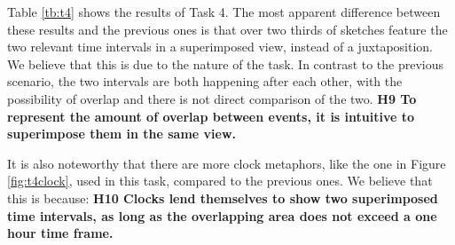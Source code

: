 Table \ref{tb:t4} shows the results of Task 4. The most apparent difference between these results and the previous ones is that over two thirds of sketches feature the two relevant time intervals in a superimposed view, instead of a juxtaposition. We believe that this is due to the nature of the task. In contrast to the previous scenario, the two intervals are both happening after each other, with the possibility of overlap and there is not direct comparison of the two. \textbf{H9 To represent the amount of overlap between events, it is intuitive to superimpose them in the same view.}\par \medskip

It is also noteworthy that there are more clock metaphors, like the one in Figure \ref{fig:t4clock}, used in this task, compared to the previous ones. We believe that this is because: \textbf{H10 Clocks lend themselves to show two superimposed time intervals, as long as the overlapping area does not exceed a one hour time frame.} \par \medskip

